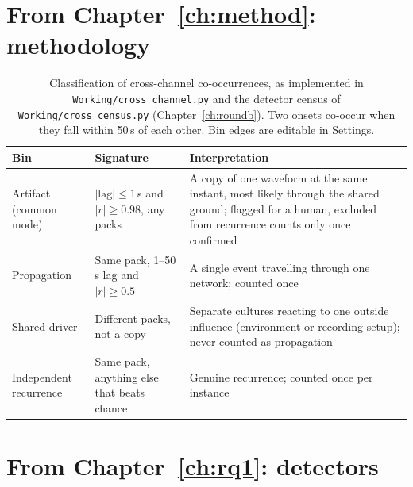 \clearpage

\section*{From Chapter~\ref{ch:method}: methodology}

\begin{table}[htbp]
\caption[Classification of cross-channel matches]{Classification of cross-channel co-occurrences, as implemented in \texttt{Working/cross\_channel.py} and the detector census of \texttt{Working/cross\_census.py} (Chapter~\ref{ch:roundb}). Two onsets co-occur when they fall within 50\,s of each other. Bin edges are editable in Settings.}
\label{tab:crosschannel}
\begin{center}
\small
\begin{tabular}{p{3.2cm} p{4.6cm} p{5.6cm}}
\toprule
\textbf{Bin} & \textbf{Signature} & \textbf{Interpretation}\\
\midrule
Artifact (common mode) & $|\text{lag}|\le1$\,s and $|r|\ge0.98$, any packs & A copy of one waveform at the same instant, most likely through the shared ground; flagged for a human, excluded from recurrence counts only once confirmed\\
\addlinespace
Propagation & Same pack, 1--50\,s lag and $|r|\ge0.5$ & A single event travelling through one network; counted once\\
\addlinespace
Shared driver & Different packs, not a copy & Separate cultures reacting to one outside influence (environment or recording setup); never counted as propagation\\
\addlinespace
Independent recurrence & Same pack, anything else that beats chance & Genuine recurrence; counted once per instance\\
\bottomrule
\end{tabular}
\end{center}
\end{table}

\clearpage

\section*{From Chapter~\ref{ch:rq1}: detectors}


